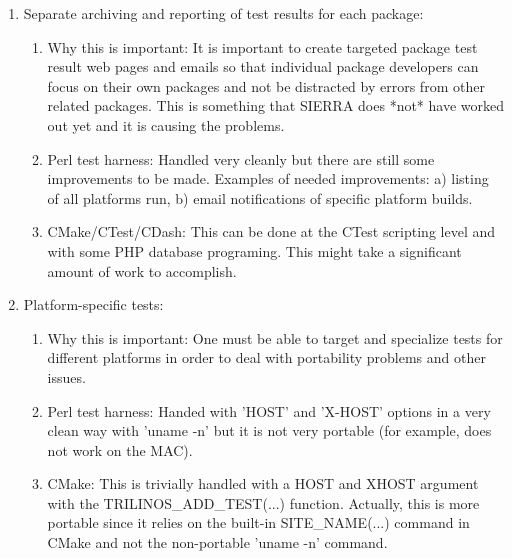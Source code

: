\documentclass[pdf,ps2pdf,11pt]{SANDreport}
\begin{document}
\begin{enumerate}

{}\item Separate archiving and reporting of test results for each
package:

  \begin{enumerate}

  {}\item Why this is important: It is important to create targeted
  package test result web pages and emails so that individual package
  developers can focus on their own packages and not be distracted by
  errors from other related packages.  This is something that SIERRA
  does *not* have worked out yet and it is causing the problems.

  {}\item Perl test harness: Handled very cleanly but there are still
  some improvements to be made.  Examples of needed improvements: a)
  listing of all platforms run, b) email notifications of specific
  platform builds.

  {}\item CMake/CTest/CDash: This can be done at the CTest scripting
  level and with some PHP database programing.  This might take a
  significant amount of work to accomplish.

  \end{enumerate}

{}\item Platform-specific tests:

  \begin{enumerate}

  {}\item Why this is important: One must be able to target and
  specialize tests for different platforms in order to deal with
  portability problems and other issues.

  {}\item Perl test harness: Handed with 'HOST' and 'X-HOST' options
  in a very clean way with 'uname -n' but it is not very portable (for
  example, does not work on the MAC).

  {}\item CMake: This is trivially handled with a HOST and XHOST
  argument with the TRILINOS\_ADD\_TEST(...) function.  Actually, this
  is more portable since it relies on the built-in SITE\_NAME(...) 
  command in CMake and not the non-portable 'uname -n' command.

  \end{enumerate}


\end{enumerate}
\end{document}
